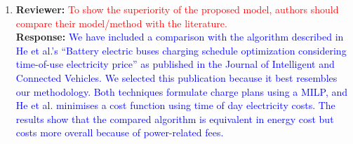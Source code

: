 \documentclass{article}
\newcommand\formatfeedback[2]
{%
	\textbf{Reviewer:} \textcolor{red}{#1} 
	\\[0.1in] \textbf{Response:} \textcolor{blue}{#2}
}
\begin{document}
\begin{enumerate}
	\item \formatfeedback{To show the superiority of the proposed model, authors should compare their model/method with the literature.}%
			     {We have included a comparison with the algorithm described in He et al.'s ``Battery electric buses charging schedule optimization considering time-of-use electricity price'' as published in the Journal of Intelligent and Connected Vehicles. We selected this publication because it best resembles our methodology.  Both techniques formulate charge plans using a MILP, and He et al. minimises a cost function using time of day electricity costs. The results show that the compared algorithm is equivalent in energy cost but costs more overall because of power-related fees.}

\end{enumerate}
\end{document}
